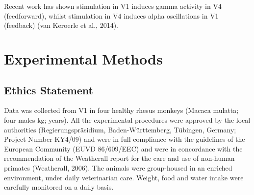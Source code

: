 Recent work has shown stimulation in \ac{V1} induces gamma activity in \ac{V4} (feedforward), whilst stimulation in \ac{V4} induces alpha oscillations in \ac{V1} (feedback) (van Keroerle et al., 2014).
\section{Experimental Methods}
\subsection{Ethics Statement}
Data was collected from \ac{V1} in four healthy rhesus monkeys (Macaca mulatta; four males \unit[8--11]{kg}; \unit[10--12]{years}).
All the experimental procedures were approved by the local authorities (Regierungspr\"asidium, Baden-W\"urttemberg, T\"ubingen, Germany; Project Number KY4/09) and were in full compliance with the guidelines of the European Community (EUVD 86/609/EEC) and were in concordance with the recommendation of the Weatherall report for the care and use of non-human primates (Weatherall, 2006).
The animals were group-housed in an enriched environment, under daily veterinarian care.
Weight, food and water intake were carefully monitored on a daily basis.

